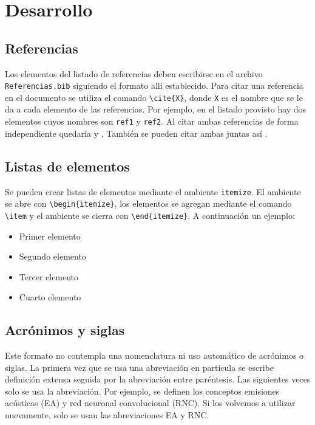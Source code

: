 \section{Desarrollo}

\subsection{Referencias}
Los elementos del listado de referencias deben escribirse en el archivo \verb!Referencias.bib! siguiendo el formato allí establecido. Para citar una referencia en el documento se utiliza el comando \verb!\cite{X}!, donde \verb!X! es el nombre que se le da a cada elemento de las referencias. Por ejemplo, en el listado provisto hay dos elementos cuyos nombres son \verb!ref1! y \verb!ref2!. Al citar ambas referencias de forma independiente quedaría \cite{ref1} y \cite{ref2}. También se pueden citar ambas juntas así \cite{ref1, ref2}.

\subsection{Listas de elementos}
Se pueden crear listas de elementos mediante el ambiente \verb!itemize!. El ambiente se abre con \verb!\begin{itemize}!, los elementos se agregan mediante el comando \verb!\item! y el ambiente se cierra con \verb!\end{itemize}!. A continuación un ejemplo:

\begin{itemize}
    \item Primer elemento
    \item Segundo elemento
    \item Tercer elemento
    \item Cuarto elemento
\end{itemize}

\subsection{Acrónimos y siglas}
Este formato no contempla una nomenclatura ni uso automático de acrónimos o siglas. La primera vez que se usa una abreviación en particula se escribe definición extensa seguida por la abreviación entre paréntesis. Las siguientes veces solo se usa la abreviación. Por ejemplo, se definen los conceptos emisiones acústicas (EA) y red neuronal convolucional (RNC). Si los volvemos a utilizar nuevamente, solo se usan las abreviaciones EA y RNC.

